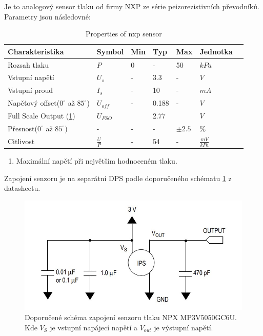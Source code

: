 Je to analogový sensor tlaku od firmy NXP ze série peizorezistivních převodníků. Parametry jsou následovné: 
\begin{table}[H]
    \label{tab:nxp_properties}
    \caption{Properties of nxp sensor}
\begin{tabular}{lllllll}
\toprule
Charakteristika                        & Symbol &  Min  & Typ & Max   & Jednotka &  \\ \midrule
Rozsah tlaku                           & $P$    &  0    &   -   & 50   & $kPa$ & \\
Vstupní napětí                         & $U_{s}$& - & 3.3 &  -  & $V$ &  \\
Vstupní proud                          & $I_{s}$ & - & 10  &  -  & $mA$ &  \\
Napěťový offset($0^{\circ}$ až $ 85^{\circ} $) & $U_{off}$& - & 0.188& -  & $V$ &  \\ 
Full Scale Output (\ref{enum:nxp_fso})                  & $U_{FSO}$ & &2.77& & $V$ & \\
Přesnost($0^{\circ}$ až $ 85^{\circ}$) & - & - & - & $\pm 2.5 $  &  $\%$ &\\
Citlivost                              & $\frac{U}{P}$ & - & 54 & - & $\frac{mV}{kPa}$ & \\
\bottomrule

\end{tabular}
\begin{enumerate}
	\item \label{enum:nxp_fso} Maximální napětí při největším hodnoceném tlaku.
\end{enumerate}
\end{table}



Zapojení senzoru je na separátní DPS podle doporučeného schématu \ref{fig:nxp_recommended} z datasheetu. 


\begin{figure}[H]
    \centering
    \includegraphics{pictures/nxp_recommended.jpg}
    \caption{Doporučené schéma zapojení senzoru tlaku NPX MP3V5050GC6U. Kde $V_S$ je vstupní napájecí napětí a $V_{out}$ je výstupní napětí.}
    \label{fig:nxp_recommended}
\end{figure}

